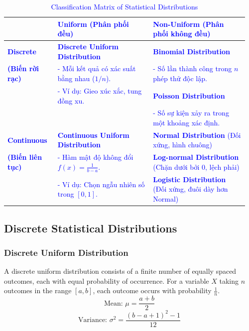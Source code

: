 \begin{table}[!htbp]
\centering
\caption{\textcolor{blue}{Classification Matrix of Statistical Distributions}}
\label{tab:distribution_matrix_m6}
\begin{tabular}{p{0.20\linewidth} | p{0.38\linewidth} | p{0.38\linewidth}}
\toprule
 & \textcolor{blue}{\textbf{Uniform (Phân phối đều)}} & \textcolor{blue}{\textbf{Non-Uniform (Phân phối không đều)}} \\
\midrule
\textcolor{blue}{\textbf{Discrete}} & \textcolor{blue}{\textbf{Discrete Uniform Distribution}} & \textcolor{blue}{\textbf{Binomial Distribution}} \\
\textcolor{blue}{\textbf{(Biến rời rạc)}} & \textcolor{blue}{- Mỗi kết quả có xác suất bằng nhau ($1/n$).} & \textcolor{blue}{- Số lần thành công trong $n$ phép thử độc lập.} \\
 & \textcolor{blue}{- Ví dụ: Gieo xúc xắc, tung đồng xu.} & \textcolor{blue}{\textbf{Poisson Distribution}} \\
 & & \textcolor{blue}{- Số sự kiện xảy ra trong một khoảng xác định.} \\
\midrule
\textcolor{blue}{\textbf{Continuous}} & \textcolor{blue}{\textbf{Continuous Uniform Distribution}} & \textcolor{blue}{\textbf{Normal Distribution} (Đối xứng, hình chuông)} \\
\textcolor{blue}{\textbf{(Biến liên tục)}} & \textcolor{blue}{- Hàm mật độ không đổi $f(x) = \frac{1}{b-a}$.} & \textcolor{blue}{\textbf{Log-normal Distribution} (Chặn dưới bởi 0, lệch phải)} \\
 & \textcolor{blue}{- Ví dụ: Chọn ngẫu nhiên số trong $[0, 1]$.} & \textcolor{blue}{\textbf{Logistic Distribution} (Đối xứng, đuôi dày hơn Normal)} \\
\bottomrule
\end{tabular}
\end{table}

\subsection{Discrete Statistical Distributions}
	\label{subsec:Discrete Statistical Distributions}

\subsubsection{Discrete Uniform Distribution}
A discrete uniform distribution consists of a finite number of equally spaced outcomes, each with equal probability of occurrence. For a variable $X$ taking $n$ outcomes in the range $[a, b]$, each outcome occurs with probability $\frac{1}{n}$.
\begin{equation}
	\text{Mean: } \mu = \frac{a + b}{2}
	\label{eq:discrete_uniform_mean_m6}
\end{equation}
\begin{equation}
	\text{Variance: } \sigma^2 = \frac{(b - a + 1)^2 - 1}{12}
	\label{eq:discrete_uniform_var_m6}
\end{equation}

